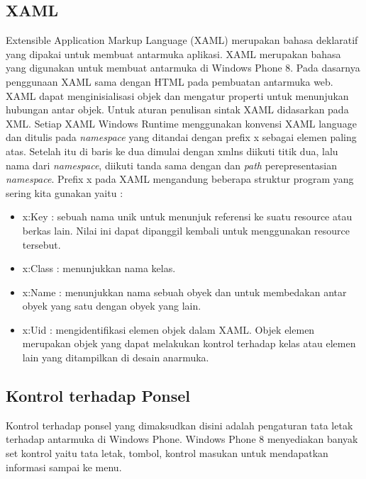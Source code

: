 \subsection{XAML}
\label{subsec:XAML}
\hspace{0.5cm} Extensible Application Markup Language (XAML) merupakan bahasa deklaratif yang dipakai untuk membuat antarmuka aplikasi. XAML merupakan bahasa yang digunakan untuk membuat antarmuka di Windows Phone 8. Pada dasarnya penggunaan XAML sama dengan HTML pada pembuatan antarmuka web. XAML dapat menginisialisasi objek dan mengatur properti untuk menunjukan hubungan antar objek.
\hspace{0.5cm} Untuk aturan penulisan sintak XAML didasarkan pada XML. Setiap XAML Windows Runtime menggunakan konvensi XAML language dan ditulis pada \textit{namespace} yang ditandai dengan prefix x sebagai elemen paling atas. Setelah itu di baris ke dua dimulai dengan xmlns diikuti titik dua, lalu nama dari \textit{namespace}, diikuti tanda sama dengan dan \textit{path} perepresentasian \textit{namespace}.
Prefix x pada XAML mengandung beberapa struktur program yang sering kita gunakan yaitu :
\begin{itemize}
	\item x:Key : sebuah nama unik untuk menunjuk referensi ke suatu resource atau berkas lain. Nilai ini dapat dipanggil kembali untuk menggunakan resource tersebut.
	\item x:Class : menunjukkan nama kelas.
	\item x:Name : menunjukkan nama sebuah obyek dan untuk membedakan antar obyek yang satu dengan obyek yang lain.
	\item x:Uid : mengidentifikasi elemen objek dalam XAML. Objek elemen merupakan objek yang dapat melakukan kontrol terhadap kelas atau elemen lain yang ditampilkan di desain anarmuka.
\end{itemize}	

\subsection{Kontrol terhadap Ponsel}
\label{subsec:Kontrol terhadap Ponsel}
\hspace{0.5cm} Kontrol terhadap ponsel yang dimaksudkan disini adalah pengaturan tata letak terhadap antarmuka di Windows Phone. Windows Phone 8 menyediakan banyak set kontrol yaitu tata letak, tombol, kontrol masukan untuk mendapatkan informasi sampai ke menu. 


